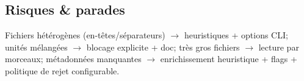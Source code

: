 \subsection{Risques \& parades}
Fichiers hétérogènes (en-têtes/séparateurs) $\rightarrow$ heuristiques + options CLI; unités mélangées $\rightarrow$ blocage explicite + doc; très gros fichiers $\rightarrow$ lecture par morceaux; métadonnées manquantes $\rightarrow$ enrichissement heuristique + flags + politique de rejet configurable.
